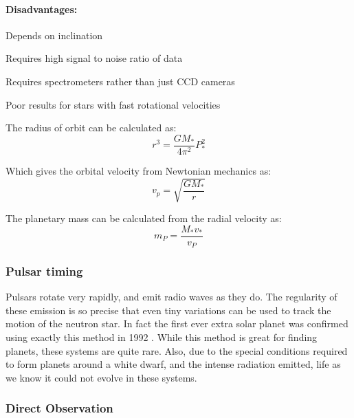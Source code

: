 \paragraph{Disadvantages:}
\begin{itemize*}
    \item Depends on inclination
    \item Requires high signal to noise ratio of data
    \item Requires spectrometers rather than just CCD cameras
    \item Poor results for stars with fast rotational velocities
\end{itemize*}

The radius of orbit can be calculated as:
\[r^3 =\frac{GM_*}{4\pi^2}P_*^2 \]

Which gives the orbital velocity from Newtonian mechanics as:
\[v_p =\sqrt{\frac{GM_*}{r}} \]

The planetary mass can be calculated from the radial velocity as:
\[ m_P = \frac{M_*v_*}{v_P} \]

\subsubsection{Pulsar timing}

Pulsars rotate very rapidly, and emit radio waves as they do. The regularity of these emission is so precise that even tiny variations can be used to track the motion of the neutron star. In fact the first ever extra solar planet was confirmed using exactly this method in 1992 \citep{wolszczan1992planetary}. While this method is great for finding planets, these systems are quite rare. Also, due to the special conditions required to form planets around a white dwarf, and the intense radiation emitted, life as we know it could not evolve in these systems.

\subsubsection{Direct Observation}

